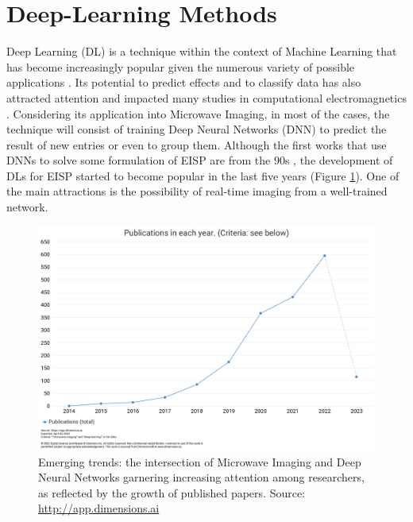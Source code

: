 	\section{Deep-Learning Methods}\label{chap:methods:deep}
		
		Deep Learning (DL) is a technique within the context of Machine Learning that has become increasingly popular given the numerous variety of possible applications \citep{lecun2015deep}. Its potential to predict effects and to classify data has also attracted attention and impacted many studies in computational electromagnetics \citep{campbell2021explosion,li2021machine,massa2018learning,seretis2022overview}. Considering its application into Microwave Imaging, in most of the cases, the technique will consist of training Deep Neural Networks (DNN) to predict the result of new entries or even to group them. Although the first works that use DNNs to solve some formulation of EISP are from the 90s \citep{azimi1992detection,low1992use}, the development of DLs for EISP started to become popular in the last five years (Figure \ref{fig:3:deeplearning}). One of the main attractions is the possibility of real-time imaging from a well-trained network.
		\begin{figure}[!h]
			\centering
			\includegraphics[width=\textwidth]{./figuras/chart.png}
			\caption[Emerging trends: the intersection of Microwave Imaging and Deep Neural Networks.]{Emerging trends: the intersection of Microwave Imaging and Deep Neural Networks garnering increasing attention among researchers, as reflected by the growth of published papers. Source: \url{http://app.dimensions.ai}}
			\label{fig:3:deeplearning}
		\end{figure}
		
